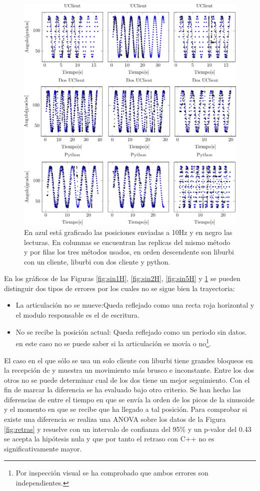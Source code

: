 \documentclass[12pt,a4paper,final,twoside]{book}
\begin{document}
\begin{figure}[H]
	\centering
    \includegraphics[scale=1]{plots/h10.pdf}
	 \caption{En azul está graficado las posiciones enviadas a 10Hz y en negro las lecturas. En columnas se encuentran las replicas del mismo método y por filas los tres métodos usados, en orden descendente son liburbi con un cliente, liburbi con dos cliente y python.}
  \label{fig:sin10H}
\end{figure}

En los gráficos de las Figuras \ref{fig:sin1H}, \ref{fig:sin2H}, \ref{fig:sin5H} y \ref{fig:sin10H} se pueden distinguir  dos tipos de errores por los cuales no se sigue bien la trayectoria:

\begin{itemize}
\item La articulación no se mueve:Queda reflejado como una recta roja horizontal y el modulo responsable es el de escritura.
\item No se recibe la posición actual: Queda reflejado como un periodo sin datos. en este caso no se puede saber si la articulación se movía o no\footnote{Por inspección visual se ha comprobado que ambos errores son independientes.}.
\end{itemize}
El caso en el que sólo se usa un solo cliente con liburbi tiene grandes bloqueos en la recepción de y muestra un movimiento más brusco e inconstante.
Entre los dos otros no se puede determinar cual de los dos tiene un mejor seguimiento. Con el fin de marcar la diferencia se ha evaluado bajo otro criterio.
Se han hecho las diferencias de entre el tiempo en que se envía la orden de los picos de la sinusoide y el momento en que se recibe que ha llegado a tal posición. Para comprobar si existe una diferencia se realiza una ANOVA sobre los datos de la Figura \ref{fig:retras} y resuelve con un intervalo de confianza del 95\% y un p-valor del 0.43  se acepta la hipótesis nula y que por tanto el retraso con C++ no es significativamente mayor. 
 
\end{document}
